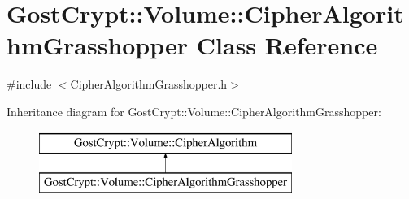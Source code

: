 \hypertarget{class_gost_crypt_1_1_volume_1_1_cipher_algorithm_grasshopper}{}\section{Gost\+Crypt\+:\+:Volume\+:\+:Cipher\+Algorithm\+Grasshopper Class Reference}
\label{class_gost_crypt_1_1_volume_1_1_cipher_algorithm_grasshopper}


{\ttfamily \#include $<$Cipher\+Algorithm\+Grasshopper.\+h$>$}

Inheritance diagram for Gost\+Crypt\+:\+:Volume\+:\+:Cipher\+Algorithm\+Grasshopper\+:\begin{figure}[H]
\begin{center}
\leavevmode
\includegraphics[height=2.000000cm]{class_gost_crypt_1_1_volume_1_1_cipher_algorithm_grasshopper}
\end{center}
\end{figure}
